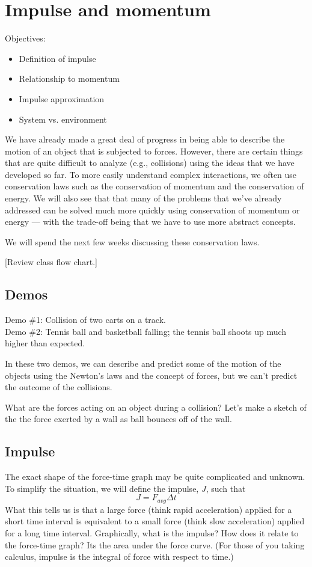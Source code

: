 \section{Impulse and momentum}
Objectives:
\begin{itemize}
\item Definition of impulse
\item Relationship to momentum
\item Impulse approximation
\item System vs. environment
\end{itemize}
  
We have already made a great deal of progress in being able to describe the motion of an object that is subjected to forces. However, there are certain things that are quite difficult to analyze (e.g., collisions) using the ideas that we have developed so far. To more easily understand complex interactions, we often use conservation laws such as the conservation of momentum and the conservation of energy. We will also see that that many of the problems that we've already addressed can be solved much more quickly using conservation of momentum or energy --- with the trade-off being that we have to use more abstract concepts.

We will spend the next few weeks discussing these conservation laws.

[Review class flow chart.]
\vspace{8cm}

\subsection{Demos}
Demo \#1: Collision of two carts on a track.\\
Demo \#2: Tennis ball and basketball falling; the tennis ball shoots up much higher than expected.

In these two demos, we can describe and predict some of the motion of the objects using the Newton's laws and the concept of forces, but we can't predict the outcome of the collisions.

What are the forces acting on an object during a collision? Let's make a sketch of the the force exerted by a wall as ball bounces off of the wall.

\vspace{5cm}

\subsection{Impulse}
The exact shape of the force-time graph may be quite complicated and unknown. To simplify the situation, we will define the impulse, $J$, such that 
$$\boxed{J=F_{avg}\Delta{t}}$$
What this tells us is that a large force (think rapid acceleration) applied for a short time interval is equivalent to a small force (think slow acceleration) applied for a long time interval. Graphically, what is the impulse? How does it relate to the force-time graph? Its the area under the force curve. (For those of you taking calculus, impulse is the integral of force with respect to time.)

